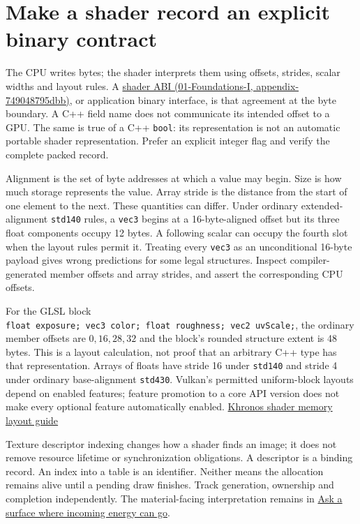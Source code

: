 \section{Make a shader record an explicit binary contract}\label{03-visual-computing-i-ch015-make-a-shader-record-an-explicit-binary-contract}

The CPU writes bytes; the shader interprets them using offsets, strides, scalar widths and layout rules. A \href{../01-Foundations-I/main.pdf\#nameddest=appendix-749048795dbb}{shader ABI (01-Foundations-I, appendix-749048795dbb)}, or application binary interface, is that agreement at the byte boundary. A C++ field name does not communicate its intended offset to a GPU. The same is true of a C++ \texttt{bool}: its representation is not an automatic portable shader representation. Prefer an explicit integer flag and verify the complete packed record.

Alignment is the set of byte addresses at which a value may begin. Size is how much storage represents the value. Array stride is the distance from the start of one element to the next. These quantities can differ. Under ordinary extended-alignment \texttt{std140} rules, a \texttt{vec3} begins at a 16-byte-aligned offset but its three float components occupy 12 bytes. A following scalar can occupy the fourth slot when the layout rules permit it. Treating every \texttt{vec3} as an unconditional 16-byte payload gives wrong predictions for some legal structures. Inspect compiler-generated member offsets and array strides, and assert the corresponding CPU offsets.

For the GLSL block \texttt{float\ exposure;\ vec3\ color;\ float\ roughness;\ vec2\ uvScale;}, the ordinary member offsets are \(0,16,28,32\) and the block's rounded structure extent is 48 bytes. This is a layout calculation, not proof that an arbitrary C++ type has that representation. Arrays of floats have stride 16 under \texttt{std140} and stride 4 under ordinary base-alignment \texttt{std430}. Vulkan's permitted uniform-block layouts depend on enabled features; feature promotion to a core API version does not make every optional feature automatically enabled. \href{https://docs.vulkan.org/guide/latest/shader_memory_layout.html}{Khronos shader memory layout guide}

Texture descriptor indexing changes how a shader finds an image; it does not remove resource lifetime or synchronization obligations. A descriptor is a binding record. An index into a table is an identifier. Neither means the allocation remains alive until a pending draw finishes. Track generation, ownership and completion independently. The material-facing interpretation remains in \hyperref[03-visual-computing-i-ch005-ask-a-surface-where-incoming-energy-can-go]{Ask a surface where incoming energy can go}.

